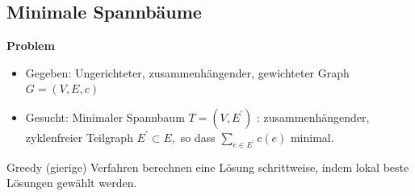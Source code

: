 \vspace{-4pt}
\begin{sectionbox}
\subsection{Minimale Spannbäume}\smallskip
\textbf{Problem}\par
\begin{itemize}
    \item Gegeben: Ungerichteter, zusammenhängender, gewichteter Graph $G=(V, E, c)$
    \item Gesucht: Minimaler Spannbaum $T=\left(V, E^{\prime}\right)$ : zusammenhängender, zyklenfreier Teilgraph $E^{\prime} \subset E,$ so dass $\sum_{e \in E^{\prime}} c(e)$ minimal.
\end{itemize}
Greedy (gierige) Verfahren berechnen eine Lösung schrittweise, indem lokal beste Lösungen gewählt werden.\par
\end{sectionbox}
\vspace{-4pt}
